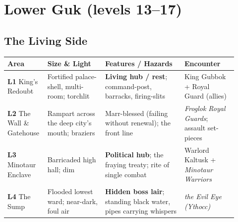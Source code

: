 \documentclass[10pt,twoside]{report}
\begin{document}
\section{Lower Guk (levels 13--17)}
\subsection*{The Living Side}
\begin{longtable}{@{}p{0.13\linewidth} p{0.24\linewidth} p{0.33\linewidth} p{0.22\linewidth}@{}}
\toprule
\textbf{\color{gukred}Area} & \textbf{\color{gukred}Size \& Light} & \textbf{\color{gukred}Features / Hazards} & \textbf{\color{gukred}Encounter} \\
\midrule
\endhead
\textbf{L1} King's Redoubt & Fortified palace-shell, multi-room; torchlit & \textbf{Living hub / rest}; command-post, barracks, firing-slits & King Gubbok + Royal Guard (allies) \\
\textbf{L2} The Wall \& Gatehouse & Rampart across the deep city's mouth; braziers & Marr-blessed (failing without renewal); the front line & \emph{Froglok Royal Guards}; assault set-pieces \\
\textbf{L3} Minotaur Enclave & Barricaded high hall; dim & \textbf{Political hub}; the fraying treaty; rite of single combat & Warlord Kaltusk + \emph{Minotaur Warriors} \\
\textbf{L4} The Sump & Flooded lowest ward; near-dark, foul air & \textbf{Hidden boss lair}; standing black water, pipes carrying whispers & \emph{the Evil Eye (Ythocc)} \\
\bottomrule
\end{longtable}
\end{document}
